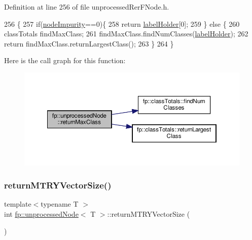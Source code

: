 Definition at line 256 of file unprocessed\+Rer\+F\+Node.\+h.


\begin{DoxyCode}
256                                            \{
257                     \textcolor{keywordflow}{if}(\hyperlink{classfp_1_1unprocessedNode_a5bb6906b09625f7893bf0ffd512b1714}{nodeImpurity}==0)\{
258                         \textcolor{keywordflow}{return} \hyperlink{classfp_1_1unprocessedNode_a2aa2f9dcba0b0a859457ed22e147f698}{labelHolder}[0];
259                     \} \textcolor{keywordflow}{else} \{
260                         classTotals findMaxClass;
261                         findMaxClass.findNumClasses(\hyperlink{classfp_1_1unprocessedNode_a2aa2f9dcba0b0a859457ed22e147f698}{labelHolder});
262                         \textcolor{keywordflow}{return} findMaxClass.returnLargestClass();
263                     \}
264                 \}
\end{DoxyCode}
Here is the call graph for this function\+:
\nopagebreak
\begin{figure}[H]
\begin{center}
\leavevmode
\includegraphics[width=350pt]{classfp_1_1unprocessedNode_af038553809a2e6d1cbe04adaba1c6b21_cgraph}
\end{center}
\end{figure}
\mbox{\label{classfp_1_1unprocessedNode_a208170fb33171f64c83839abbf300705}} 
\subsubsection{\texorpdfstring{return\+M\+T\+R\+Y\+Vector\+Size()}{returnMTRYVectorSize()}\hspace{0.1cm}{\footnotesize\ttfamily [1/2]}}
{\footnotesize\ttfamily template$<$typename T $>$ \\
int \hyperlink{classfp_1_1unprocessedNode}{fp\+::unprocessed\+Node}$<$ T $>$\+::return\+M\+T\+R\+Y\+Vector\+Size (\begin{DoxyParamCaption}{ }\end{DoxyParamCaption})\hspace{0.3cm}{\ttfamily [inline]}}



